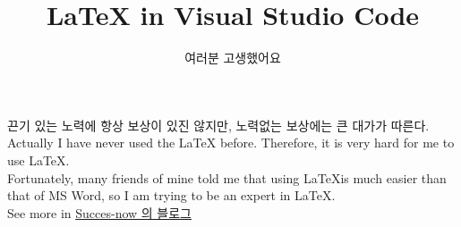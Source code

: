 \documentclass[11pt]{article}
\title{\LaTeX{} in Visual Studio Code}
\author{여러분 고생했어요}
\begin{document}
\maketitle
끈기 있는 노력에 항상 보상이 있진 않지만, 노력없는 보상에는 큰 대가가 따른다.\\
\indent Actually I have never used the \LaTeX{} before. Therefore, it is very hard for me to use \LaTeX{}.\\
\indent Fortunately, many friends of mine told me that using \LaTeX is much easier than that of MS Word,
so I am trying to be an expert in \LaTeX{}.\\

See more in \href{https://success-now.tistory.com/}{Succes-now 의 블로그}
\end{document}
